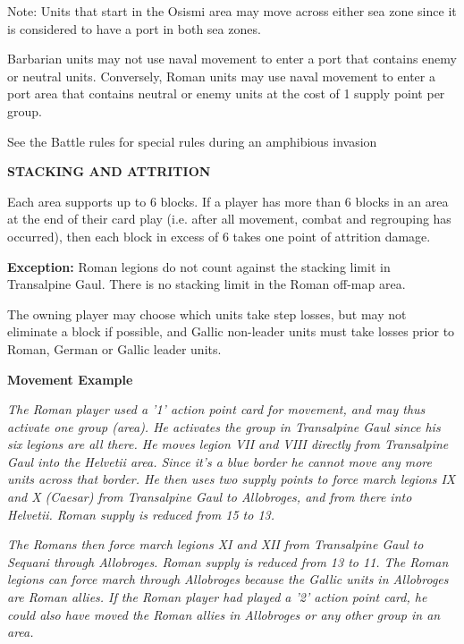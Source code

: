 Note: Units that start in the Osismi area may move across either sea zone since it is considered to have a port in both sea zones.

Barbarian units may not use naval movement to enter a port that contains enemy or neutral units. Conversely, Roman units may use naval movement to enter a port area that contains neutral or enemy units at the cost of 1 supply point per group.

See the Battle rules for special rules during an amphibious invasion

\textbf{STACKING AND ATTRITION}
\par
Each area supports up to 6 blocks. If a player has more than 6 blocks in an area at the end of their card play (i.e. after all movement, combat and regrouping has occurred), then each block in excess of 6 takes one point of attrition damage.

\textbf{Exception:} Roman legions do not count against the stacking limit in Transalpine Gaul. There is no stacking limit in the Roman off-map area.

The owning player may choose which units take step losses, but may not eliminate a block if possible, and Gallic non-leader units must take losses prior to Roman, German or Gallic leader units.

\textbf{Movement Example}
\par
\textit{The Roman player used a '1' action point card for movement, and may thus activate one group (area). He activates the group in Transalpine Gaul since his six legions are all there. He moves legion VII and VIII directly from Transalpine Gaul into the Helvetii area. Since it's a blue border he cannot move any more units across that border. He then uses two supply points to force march legions IX and X (Caesar) from Transalpine Gaul to Allobroges, and from there into Helvetii. Roman supply is reduced from 15 to 13.}
\par
\textit{The Romans then force march legions XI and XII from Transalpine Gaul to Sequani through Allobroges. Roman supply is reduced from 13 to 11. The Roman legions can force march through Allobroges because the Gallic units in Allobroges are Roman allies. If the Roman player had played a '2' action point card, he could also have moved the Roman allies in Allobroges or any other group in an area.}
